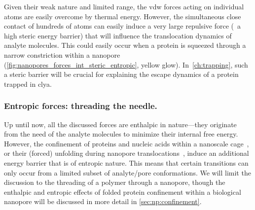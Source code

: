 Given their weak nature and limited range, the \gls{vdw} forces acting on individual atoms are easily overcome
by thermal energy. However, the simultaneous close contact of hundreds of atoms can easily induce a very large
repulsive force (\ie~a high steric energy barrier) that will influence the translocation dynamics of analyte
molecules. This could easily occur when a protein is squeezed through a narrow constriction within a nanopore
(\cref{fig:nanopores_forces_int_steric_entropic}, yellow glow). In~\cref{ch:trapping}, such a steric barrier
will be crucial for explaining the escape dynamics of a protein trapped in \gls{clya}.


\subsubsection{Entropic forces: threading the needle.}
%

Up until now, all the discussed forces are enthalpic in nature---they originate from the need of the analyte
molecules to minimize their internal free energy. However, the confinement of proteins and nucleic acids
within a nanoscale cage~\cite{Liu-2015b}, or their (forced) unfolding during nanopore
translocations~\cite{Muthukumar-2010,Cressiot-2012,Cressiot-2015}, induce an additional energy barrier that is
of entropic nature. This means that certain transitions can only occur from a limited subset of analyte/pore
conformations. We will limit the discussion to the threading of a polymer through a nanopore, though the
enthalpic and entropic effects of folded protein confinement within a biological nanopore will be discussed in
more detail in \cref{sec:np:confinement}.

